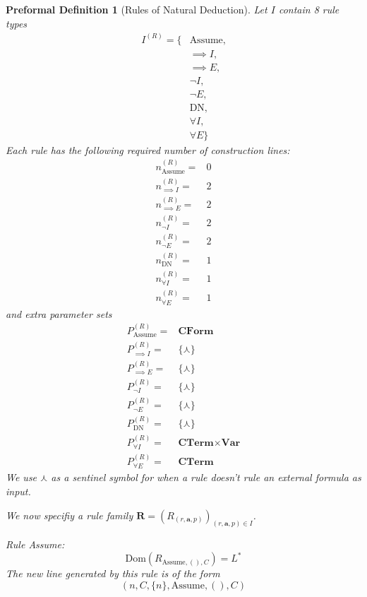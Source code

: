 \documentclass[oneside, 12pt]{book}
\theoremstyle{break}
\newtheorem{preformal definition}[definition]{Preformal Definition}
\newtheorem{preformal theorem}[theorem]{Preformal Theorem}
\newcommand{\bv}[1]{\boldsymbol{#1}}
\begin{document}
		\begin{preformal definition}[Rules of Natural Deduction]
			Let $I$ contain 8 rule types
			\begin{align*}
				I^{(R)} = \Big\{&\text{Assume},\\
				&\implies I,\\
				&\implies E,\\
				&\lnot I,\\
				&\lnot E,\\
				&\text{DN},\\
				&\forall I,\\
				&\forall E\Big\}
			\end{align*}
			Each rule has the following required number of construction lines:
			\begin{align*}
				n^{(R)}_{\text{Assume}} =& 0\\
				n^{(R)}_{\implies I} =& 2\\
				n^{(R)}_{\implies E} =& 2\\
				n^{(R)}_{\lnot I} =& 2\\
				n^{(R)}_{\lnot E} =& 2\\
				n^{(R)}_{\text{DN}} =&1\\
				n^{(R)}_{\forall I} =& 1\\
				n^{(R)}_{\forall E} =& 1
			\end{align*}
			and extra parameter sets
			\begin{align*}
				P^{(R)}_{\text{Assume}} =& \textbf{CForm}\\
				P^{(R)}_{\implies I} =& \{\curlywedge\}\\
				P^{(R)}_{\implies E} =& \{\curlywedge\}\\
				P^{(R)}_{\lnot I} =& \{\curlywedge\}\\
				P^{(R)}_{\lnot E} =& \{\curlywedge\}\\
				P^{(R)}_{\text{DN}} =& \{\curlywedge\}\\
				P^{(R)}_{\forall I} =& \textbf{CTerm} \times \textbf{Var}\\
				P^{(R)}_{\forall E} =& \textbf{CTerm}
			\end{align*}
			We use $\curlywedge$ as a sentinel symbol for when a rule doesn't rule an external formula as input.
			
			
			We now specifiy a rule family $\bv{R} = (R_{(r, \bv{a}, p)})_{(r, \bv{a}, p) \in I}$.
			
			Rule Assume: 
			\begin{equation*}
				\text{Dom}(R_{\text{Assume}, (), C}) = L^*
			\end{equation*}
			The new line generated by this rule is of the form
			\begin{equation*}
				(n, C, \{n\}, \text{Assume}, (), C)
			\end{equation*}
			

\end{preformal definition}
\end{document}
